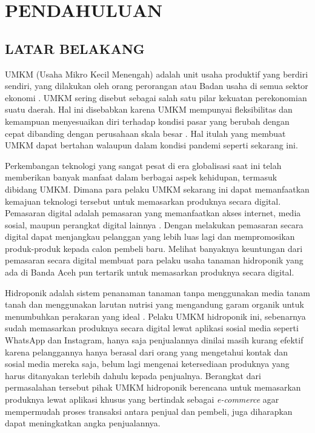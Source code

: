 \fancyhf{} 
\fancyfoot[C]{\thepage}

\chapter{PENDAHULUAN}

\section{\uppercase{LATAR BELAKANG}}
UMKM (Usaha Mikro Kecil Menengah) adalah unit usaha produktif yang berdiri sendiri, yang dilakukan oleh orang perorangan atau Badan usaha di semua sektor ekonomi \citep{tambunan2012peluang}. UMKM sering disebut sebagai salah satu pilar kekuatan perekonomian suatu daerah. Hal ini disebabkan karena UMKM mempunyai fleksibilitas dan kemampuan menyesuaikan diri terhadap kondisi pasar yang berubah dengan cepat dibanding dengan perusahaan skala besar \citep{sartika2002ekonomi}. Hal itulah yang membuat UMKM dapat bertahan walaupun dalam kondisi pandemi seperti sekarang ini.

\par Perkembangan teknologi yang sangat pesat di era globalisasi saat ini telah memberikan banyak manfaat dalam berbagai aspek kehidupan, termasuk dibidang UMKM. Dimana para pelaku UMKM sekarang ini dapat memanfaatkan kemajuan teknologi tersebut untuk memasarkan produknya secara digital. Pemasaran digital adalah pemasaran yang memanfaatkan akses internet, media sosial, maupun perangkat digital lainnya \citep{hardilawati2020strategi}. Dengan melakukan pemasaran secara digital dapat menjangkau pelanggan yang lebih luas lagi dan mempromosikan produk-produk kepada calon pembeli baru. Melihat banyaknya keuntungan dari pemasaran secara digital membuat para pelaku usaha tanaman hidroponik yang ada di Banda Aceh pun tertarik untuk memasarkan produknya secara digital.

\par Hidroponik adalah sistem penanaman tanaman tanpa menggunakan media tanam tanah dan menggunakan larutan nutrisi yang mengandung garam organik untuk menumbuhkan perakaran yang ideal \citep{rosliani2005budidaya}. Pelaku UMKM hidroponik ini, sebenarnya sudah memasarkan produknya secara digital lewat aplikasi sosial media seperti WhatsApp dan Instagram, hanya saja penjualannya dinilai masih kurang efektif karena pelanggannya hanya berasal dari orang yang mengetahui kontak dan sosial media mereka saja, belum lagi mengenai ketersediaan produknya yang harus ditanyakan terlebih dahulu kepada penjualnya. Berangkat dari permasalahan tersebut pihak UMKM hidroponik berencana untuk memasarkan produknya lewat aplikasi khusus yang bertindak sebagai \textit{e-commerce} agar mempermudah proses transaksi antara penjual dan pembeli, juga diharapkan dapat meningkatkan angka penjualannya.

